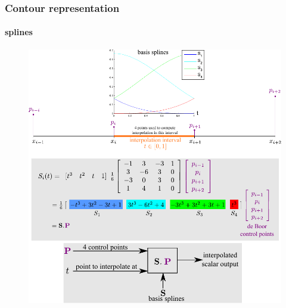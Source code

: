\begin{frame}[plain]
\frametitle{Contour representation}
\framesubtitle{splines}
	\begin{changemargin}{-1.3in}{0in} 
		\begin{figure}
			\includegraphics[height=0.85\textheight]{figs/theory_curves_UniformCubicBsplines.pdf}
		\end{figure}
	\end{changemargin}
\end{frame}






